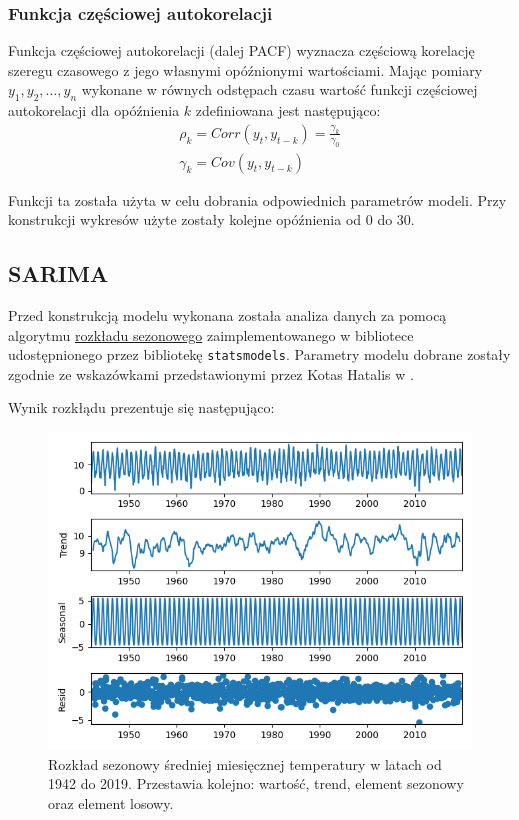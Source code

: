 \documentclass[12pt]{article}
\begin{document}
\subsubsection{Funkcja częściowej autokorelacji}

Funkcja częściowej autokorelacji (dalej PACF) wyznacza częściową korelację szeregu czasowego z jego własnymi opóźnionymi wartościami. Mając pomiary $y_1, y_2, \dots, y_n$ wykonane w równych odstępach czasu wartość funkcji częściowej autokorelacji dla opóźnienia $k$ zdefiniowana jest następująco:
\begin{gather*}
    \rho_k = Corr(y_t, y_{t - k}) = \frac{\gamma_k}{\gamma_0} \\
    \gamma_k = Cov(y_t, y_{t - k})
\end{gather*}

Funkcji ta została użyta w celu dobrania odpowiednich parametrów modeli. Przy konstrukcji wykresów użyte zostały kolejne opóźnienia od $0$ do $30$.

\subsection{SARIMA}

Przed konstrukcją modelu wykonana została analiza danych za pomocą algorytmu \href{https://www.statsmodels.org/stable/generated/statsmodels.tsa.seasonal.seasonal_decompose.html}{rozkładu sezonowego} zaimplementowanego w bibliotece  udostępnionego przez bibliotekę \texttt{statsmodels}. Parametry modelu dobrane zostały zgodnie ze wskazówkami przedstawionymi przez Kotas Hatalis w \cite{A}.

Wynik rozkłądu prezentuje się następująco:

\begin{figure}[H]
    \includegraphics[width=\textwidth]{img/decomposition.png}
    \caption{Rozkład sezonowy średniej miesięcznej temperatury w latach od 1942 do 2019.
        Przestawia kolejno: wartość, trend, element sezonowy oraz element losowy.}
\end{figure}
\end{document}
